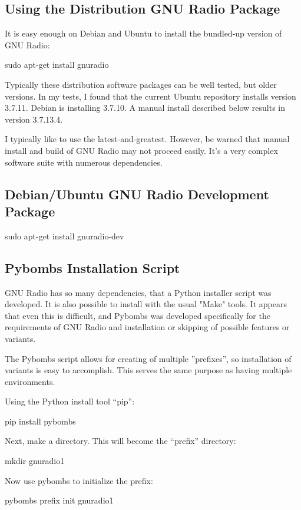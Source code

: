 \documentclass[oneside,letterpaper,12pt]{book}
\begin{document}
\subsection{Using the Distribution GNU Radio Package}

It is easy enough on Debian and Ubuntu to install the bundled-up version of GNU Radio:

sudo apt-get install gnuradio

Typically these distribution software packages can be well tested, but older versions.
In my tests, I found that the current Ubuntu repository installs version 3.7.11.  Debian is installing 3.7.10.
A manual install described below results in version 3.7.13.4.

I typically like to use the latest-and-greatest.  However, be warned that manual install
 and build of GNU Radio may not proceed easily.  It's a very complex software suite with
 numerous dependencies.

\subsection{Debian/Ubuntu GNU Radio Development Package}

sudo apt-get install gnuradio-dev

\subsection{Pybombs Installation Script}

GNU Radio has so many dependencies, that a Python installer script was developed.
It is also possible to install with the usual "Make" tools.  It appears that even
this is difficult, and Pybombs was developed specifically for the requirements of
GNU Radio and installation or skipping of possible features or variants.

The Pybombs script allows for creating of multiple ''prefixes'', so installation
of variants is easy to accomplish.  This serves the same purpose as having multiple
environments.

Using the Python install tool ``pip'':

pip install pybombs

Next, make a directory.  This will become the ``prefix'' directory:

mkdir gnuradio1

Now use pybombs to initialize the prefix:

pybombs prefix init gnuradio1
\end{document}
